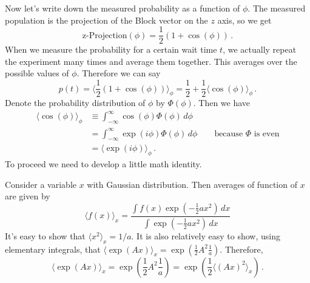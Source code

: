 \documentclass{article}
\begin{document}
Now let's write down the measured probability as a function of $\phi$.
The measured population is the projection of the Block vector on the $z$ axis, so we get
\begin{equation}
\textrm{z-Projection}(\phi)=\frac{1}{2}\left(1+\cos(\phi)\right) \, .
\end{equation}
When we measure the probability for a certain wait time $t$, we actually repeat the experiment many times and average them together.
This averages over the possible values of $\phi$.
Therefore we can say\begin{equation}
p(t)
= \langle\frac{1}{2}\left(1+\cos(\phi)\right)\rangle_{\phi}
= \frac{1}{2}+\frac{1}{2}\langle\cos(\phi)\rangle_{\phi} \, .
\end{equation}
Denote the probability distribution of $\phi$ by $\Phi(\phi)$.
Then we have
\begin{align}
\langle\cos\left(\phi\right)\rangle_{\phi}
& \equiv \int_{-\infty}^{\infty}\cos(\phi)\Phi(\phi)\, d\phi \\
& = \int_{-\infty}^{\infty}\exp(i\phi)\Phi(\phi)\, d\phi\qquad\textrm{because }\Phi\textrm{ is even} \\
& = \langle\exp(i\phi)\rangle_{\phi} \, .
\end{align}
To proceed we need to develop a little math identity.

Consider a variable $x$ with Gaussian distribution.
Then averages of function of $x$ are given by
\begin{equation}
\langle f(x)\rangle_{x}=\frac{\int f(x)\exp(-\frac{1}{2}ax^{2})\, dx}{\int\exp(-\frac{1}{2}ax^{2})\, dx}
\end{equation}
It's easy to show that $\langle x^{2}\rangle_{x}=1/a$.
It is also relatively easy to show, using elementary integrals, that $\langle\exp(Ax)\rangle_{x}=\exp(\frac{1}{2}A^{2}\frac{1}{a})$.
Therefore,\begin{equation}
\langle \exp(Ax)\rangle_{x}
= \exp\left(\frac{1}{2}A^{2}\frac{1}{a}\right)
= \exp \left( \frac{1}{2}\langle(Ax)^{2}\rangle_{x} \right) \, .
\end{equation}
\end{document}
